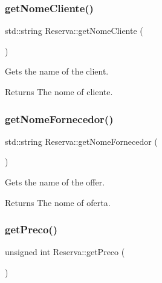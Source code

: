 \subsubsection{\texorpdfstring{get\+Nome\+Cliente()}{getNomeCliente()}}
{\footnotesize\ttfamily std\+::string Reserva\+::get\+Nome\+Cliente (\begin{DoxyParamCaption}{ }\end{DoxyParamCaption})\hspace{0.3cm}{\ttfamily [inline]}}



Gets the name of the client. 

\begin{DoxyReturn}{Returns}
The nome of cliente. 
\end{DoxyReturn}
\mbox{\label{classReserva_ad54ef5f67fa096e711d2ab526db30bf3}} 
\subsubsection{\texorpdfstring{get\+Nome\+Fornecedor()}{getNomeFornecedor()}}
{\footnotesize\ttfamily std\+::string Reserva\+::get\+Nome\+Fornecedor (\begin{DoxyParamCaption}{ }\end{DoxyParamCaption})\hspace{0.3cm}{\ttfamily [inline]}}



Gets the name of the offer. 

\begin{DoxyReturn}{Returns}
The nome of oferta. 
\end{DoxyReturn}
\mbox{\label{classReserva_a7d6a55cda46a28d62af5870c98cbc3d5}} 
\subsubsection{\texorpdfstring{get\+Preco()}{getPreco()}}
{\footnotesize\ttfamily unsigned int Reserva\+::get\+Preco (\begin{DoxyParamCaption}{ }\end{DoxyParamCaption})\hspace{0.3cm}{\ttfamily [inline]}}



